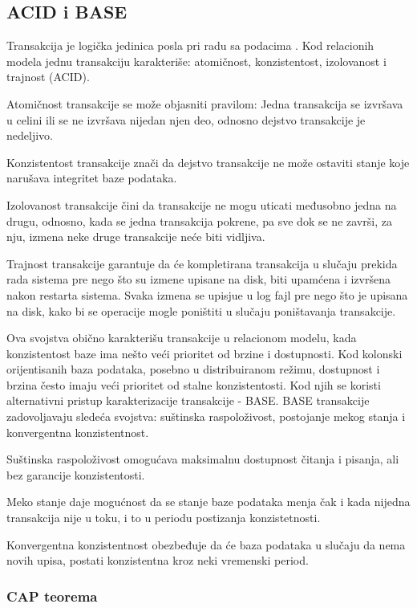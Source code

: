 \documentclass[12pt,oneside]{memoir}
\begin{document}
\subsection{ACID i BASE}

Transakcija je logička jedinica posla pri radu sa podacima \cite{URBP}. Kod relacionih modela jednu transakciju karakteriše: atomičnost, konzistentost, izolovanost i trajnost (ACID).

Atomičnost transakcije se može objasniti pravilom: Jedna transakcija se izvršava u celini ili se ne izvršava nijedan njen deo, odnosno dejstvo transakcije je nedeljivo. 

Konzistentost transakcije znači da dejstvo transakcije ne može ostaviti stanje koje narušava integritet baze podataka.

Izolovanost transakcije čini da transakcije ne mogu uticati međusobno jedna na drugu, odnosno, kada se jedna transakcija pokrene, pa sve dok se ne završi, za nju, izmena neke druge transakcije neće biti vidljiva.

Trajnost transakcije garantuje da će kompletirana transakcija u slučaju prekida rada sistema pre nego što su izmene upisane na disk, biti upamćena i izvršena nakon restarta sistema. Svaka izmena se upisjue u log fajl pre nego što je upisana na disk, kako bi se operacije mogle poništiti u slučaju poništavanja transakcije.

Ova svojstva obično karakterišu transakcije u relacionom modelu, kada konzistentost baze ima nešto veći prioritet od brzine i dostupnosti. Kod kolonski orijentisanih baza podataka, posebno u distribuiranom režimu, dostupnost i brzina često imaju veći prioritet od stalne konzistentosti. Kod njih se koristi alternativni pristup karakterizacije transakcije - BASE. BASE transakcije zadovoljavaju sledeća svojstva: suštinska raspoloživost, postojanje mekog stanja i konvergentna konzistentnost.

Suštinska raspoloživost omogućava maksimalnu dostupnost čitanja i pisanja, ali bez garancije konzistentosti.

Meko stanje daje mogućnost da se stanje baze podataka menja čak i kada nijedna transakcija nije u toku, i to u periodu postizanja konzistetnosti.

Konvergentna konzistentnost obezbeđuje da će baza podataka u slučaju da nema novih upisa, postati konzistentna kroz neki vremenski period. 

\subsubsection{CAP teorema}
\end{document}
